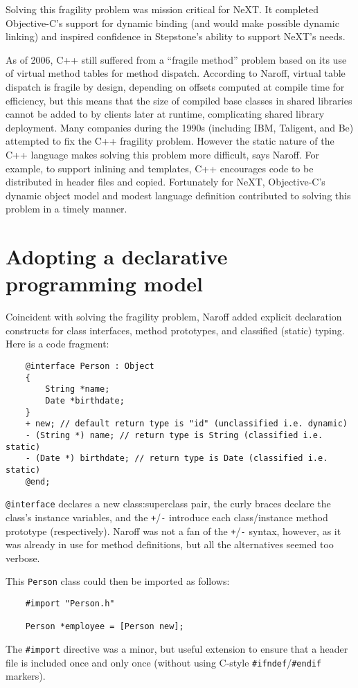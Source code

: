 \documentclass[acmsmall,screen]{acmart}
\begin{document}
Solving this fragility problem was mission critical for NeXT. It completed Objective-C's support for dynamic binding (and would make possible dynamic linking) and inspired confidence in Stepstone's ability to support NeXT's needs.

As of 2006, C++ still suffered from a ``fragile method'' problem based on its use of virtual method tables for method dispatch. According to Naroff, virtual table dispatch is fragile by design, depending on offsets computed at compile time for efficiency, but this means that the size of compiled base classes in shared libraries cannot be added to by clients later at runtime, complicating shared library deployment. Many companies during the 1990s (including IBM, Taligent, and Be) attempted to fix the C++ fragility problem. However the static nature of the C++ language makes solving this problem more difficult, says Naroff. For example, to support inlining and templates, C++ encourages code to be distributed in header files and copied. Fortunately for NeXT, Objective-C's dynamic object model and modest language definition contributed to solving this problem in a timely manner. 
\section{Adopting a declarative programming model}
\label{sec-declarative}
Coincident with solving the fragility problem, Naroff added explicit declaration constructs for class interfaces, method prototypes, and classified (static) typing. Here is a code fragment:
\begin{verbatim}
    @interface Person : Object
    {
        String *name;
        Date *birthdate;
    }
    + new; // default return type is "id" (unclassified i.e. dynamic)
    - (String *) name; // return type is String (classified i.e. static)
    - (Date *) birthdate; // return type is Date (classified i.e. static)
    @end;
\end{verbatim}
\verb$@interface$ declares a new class:superclass pair, the curly braces declare the class's instance variables, and the \verb$+$/\verb$-$ introduce each class/instance method prototype (respectively). Naroff was not a fan of the \verb$+$/\verb$-$ syntax, however, as it was already in use for method definitions, but all the alternatives seemed too verbose.

This \verb$Person$ class could then be imported as follows:
\begin{verbatim}
    #import "Person.h"
    
    Person *employee = [Person new];
\end{verbatim}
The \verb$#import$ directive was a minor, but useful extension to ensure that a header file is included once and only once (without using C-style \verb$#ifndef$/\verb$#endif$ markers). 
\end{document}
